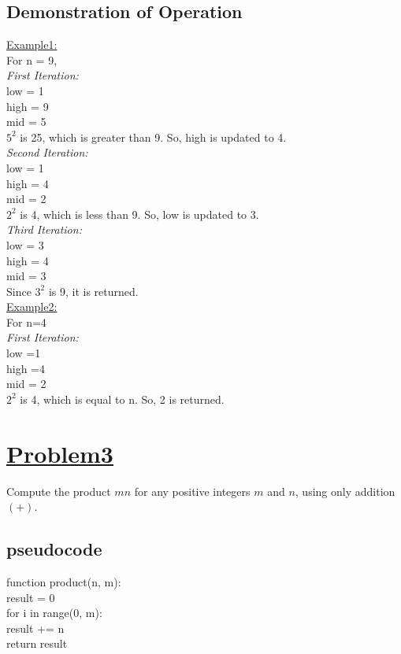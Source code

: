 \documentclass[a4paper,12pt]{article}
\begin{document}
    \subsection{Demonstration of Operation}
    \underline{Example1:}\\
    For n = 9,\\
    \textit{First Iteration:}\\
    low = 1\\
    high = 9\\
    mid = 5\\
    $5^2$ is 25, which is greater than 9. So, high is updated to 4.\\
    \textit{Second Iteration:}\\
    low = 1\\
    high = 4\\
    mid = 2\\
    $2^2$ is 4, which is less than 9. So, low is updated to 3.\\
    \textit{Third Iteration:}\\
    low = 3\\
    high = 4\\
    mid = 3\\
    Since $3^2$ is 9, it is returned.\\
    \underline{Example2:}\\
    For n=4\\
    \textit{First Iteration:}\\
    low =1\\
    high =4\\
    mid = 2\\
    $2^2$ is 4, which is equal to n. So, 2 is returned.


    \section{\underline{\underline{Problem3}}}
    Compute the product $mn$ for any positive integers $m$ and $n$, using
    only addition $(+)$.
    \subsection{pseudocode}
    \begin{tabbing}
        function product(n, m):\\
    \hspace{1em}result = 0\\
    \hspace{1em}for i in range(0, m):\\
    \hspace{2em}result += n\\
    \hspace{1em}return result
    \end{tabbing}
\end{document}
